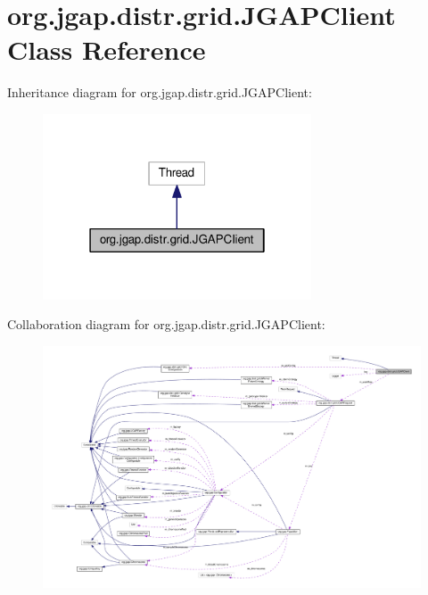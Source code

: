\hypertarget{classorg_1_1jgap_1_1distr_1_1grid_1_1_j_g_a_p_client}{\section{org.\-jgap.\-distr.\-grid.\-J\-G\-A\-P\-Client Class Reference}
\label{classorg_1_1jgap_1_1distr_1_1grid_1_1_j_g_a_p_client}
}


Inheritance diagram for org.\-jgap.\-distr.\-grid.\-J\-G\-A\-P\-Client\-:
\nopagebreak
\begin{figure}[H]
\begin{center}
\leavevmode
\includegraphics[width=226pt]{classorg_1_1jgap_1_1distr_1_1grid_1_1_j_g_a_p_client__inherit__graph}
\end{center}
\end{figure}


Collaboration diagram for org.\-jgap.\-distr.\-grid.\-J\-G\-A\-P\-Client\-:
\nopagebreak
\begin{figure}[H]
\begin{center}
\leavevmode
\includegraphics[width=350pt]{classorg_1_1jgap_1_1distr_1_1grid_1_1_j_g_a_p_client__coll__graph}
\end{center}
\end{figure}
